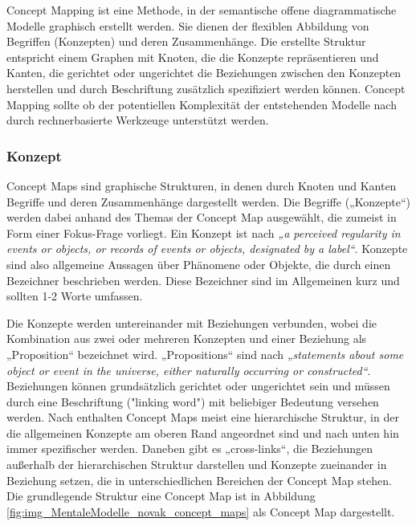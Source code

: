 Concept Mapping \citep{Novak06} ist eine Methode, in der semantische offene diagrammatische Modelle graphisch erstellt werden. Sie dienen der flexiblen Abbildung von Begriffen (Konzepten) und deren Zusammenhänge. Die erstellte Struktur entspricht einem Graphen mit Knoten, die die Konzepte repräsentieren und Kanten, die gerichtet oder ungerichtet die Beziehungen zwischen den Konzepten herstellen und durch Beschriftung zusätzlich spezifiziert werden können. Concept Mapping sollte ob der potentiellen Komplexität der entstehenden Modelle nach \citet{Novak06} durch rechnerbasierte Werkzeuge unterstützt werden. 

\subsubsection{Konzept}

Concept Maps sind graphische Strukturen, in denen durch Knoten und Kanten Begriffe und deren Zusammenhänge dargestellt werden. Die Begriffe („Konzepte“) werden dabei anhand des Themas der Concept Map ausgewählt, die zumeist in Form einer Fokus-Frage vorliegt. Ein Konzept ist nach \citep[][S. 1]{Novak06} \emph{„a perceived regularity in events or objects, or records of events or objects, designated by a label“}. Konzepte sind also allgemeine Aussagen über Phänomene oder Objekte, die durch einen Bezeichner beschrieben werden. Diese Bezeichner sind im Allgemeinen kurz und sollten 1-2 Worte umfassen.

Die Konzepte werden untereinander mit Beziehungen verbunden, wobei die Kombination aus zwei oder mehreren Konzepten und einer Beziehung als „Proposition“ bezeichnet wird. „Propositions“ sind nach \citep[][S. 1]{Novak06} \emph{„statements about some object or event in the universe, either naturally occurring or constructed“}. Beziehungen können grundsätzlich gerichtet oder ungerichtet sein und müssen durch eine Beschriftung ("linking word") mit beliebiger Bedeutung versehen werden. Nach \citep{Novak06} enthalten Concept Maps meist eine hierarchische Struktur, in der die allgemeinen Konzepte am oberen Rand angeordnet sind und nach unten hin immer spezifischer werden. Daneben gibt es „cross-links“, die Beziehungen außerhalb der hierarchischen Struktur darstellen und Konzepte zueinander in Beziehung setzen, die in unterschiedlichen Bereichen der Concept Map stehen. Die grundlegende Struktur eine Concept Map ist in Abbildung \ref{fig:img_MentaleModelle_novak_concept_maps} als Concept Map dargestellt.

